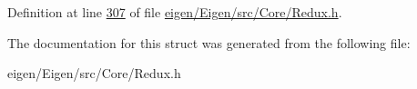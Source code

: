 Definition at line \hyperlink{eigen_2_eigen_2src_2_core_2_redux_8h_source_l00307}{307} of file \hyperlink{eigen_2_eigen_2src_2_core_2_redux_8h_source}{eigen/\+Eigen/src/\+Core/\+Redux.\+h}.



The documentation for this struct was generated from the following file\+:\begin{DoxyCompactItemize}
\item 
eigen/\+Eigen/src/\+Core/\+Redux.\+h\end{DoxyCompactItemize}

